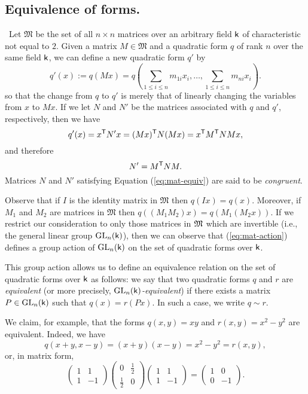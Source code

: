 \subsection{Equivalence of forms.}\label{sec:mat-equiv}~Let \(\mathfrak{M}\) be
the set of all \(n \times n\) matrices over an arbitrary field \(\mathsf{k}\) of
characteristic not equal to \(2\). Given a matrix \(M \in \mathfrak{M}\) and a
quadratic form \(q\) of rank \(n\) over the same field \(\mathsf{k}\), we can define
a new quadratic form \(q'\) by
\begin{equation}\label{eq:mat-action}
  q'(x) := q(Mx) = q\left(\sum_{1 \leq i \leq n} m_{1i}x_i, \dots, \sum_{1 \leq i \leq n} m_{ni}x_i\right).
\end{equation}
so that the change from \(q\) to \(q'\) is merely that of linearly changing the
variables from \(x\) to \(Mx\). If we let \(N\) and \(N'\) be the matrices
associated with \(q\) and \(q'\), respectively, then we have
\[
  q'(x) = x^{\mathsf{T}}N'x = (Mx)^{\mathsf{T}}N(Mx) = x^{\mathsf{T}} M^{\mathsf{T}}NMx,
\]
and therefore
\begin{equation}\label{eq:mat-equiv}
  N' = M^{\mathsf{T}}NM.
\end{equation}
Matrices \(N\) and \(N'\) satisfying Equation (\ref{eq:mat-equiv}) are said to
be \emph{congruent}.

Observe that if \(I\) is the identity matrix in \(\mathfrak{M}\) then \(q(Ix) =
q(x)\). Moreover, if \(M_1\) and \(M_2\) are matrices in \(\mathfrak{M}\) then
\(q((M_1M_2)x) = q(M_1(M_2x))\). If we restrict our consideration to only those
matrices in \(\frak{M}\) which are invertible (i.e., the general linear group
\(\mathrm{GL}_{n}(\mathsf{k})\)), then we can observe that (\ref{eq:mat-action}) defines
a group action of \(\mathrm{GL}_{n}(\mathsf{k})\) on the set of quadratic forms over
\(\mathsf{k}\).

This group action allows us to define an equivalence relation
\cite[p.~89]{hungerford2012algebra} on the set of quadratic forms over
\(\mathsf{k}\) as follows: we say that two quadratic forms \(q\) and \(r\) are
\emph{equivalent} (or more precisely, \emph{\(\mathrm{GL}_{n}(\mathsf{k})\)-equivalent})
if there exists a matrix \(P \in \mathrm{GL}_{n}(\mathsf{k})\) such that \(q(x) =
r(Px)\). In such a case, we write \(q \sim r\).

We claim, for example, that the forms \(q(x, y) = xy\) and \(r(x, y) = x^2 -
y^2\) are equivalent. Indeed, we have
\[
  q(x+y, x-y) = (x+y)(x-y) = x^2 - y^2 = r(x, y),
\]
or, in matrix form,
\[
  \begin{pmatrix}
    1 & 1 \\
    1 & -1
  \end{pmatrix}
  \begin{pmatrix}
    0 & \frac{1}{2} \\
    \frac{1}{2} & 0
  \end{pmatrix}
  \begin{pmatrix}
    1 & 1 \\
    1 & -1
  \end{pmatrix}
  =
  \begin{pmatrix}
    1 & 0 \\
    0 & -1
  \end{pmatrix}.
\]

